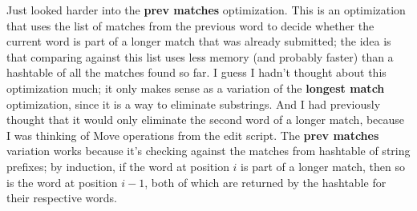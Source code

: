 Just looked harder into the \textbf{prev matches} optimization.
This is an optimization that uses the list of matches from the
previous word to decide whether the current word is part of a longer
match that was already submitted; the idea is that comparing against
this list uses less memory (and probably faster)
than a hashtable of all the matches found so far.
I guess I hadn't thought about this optimization much; it only
makes sense as a variation of the \textbf{longest match} optimization,
since it is a way to eliminate substrings.
And I had previously thought that it would only eliminate the
second word of a longer match, because I was thinking of Move
operations from the edit script.  The \textbf{prev matches}
variation works because it's checking against the matches
from hashtable of string prefixes; by induction, if the word
at position $i$ is part of a longer match, then so is the word
at position $i-1$, both of which are returned by the hashtable
for their respective words.


